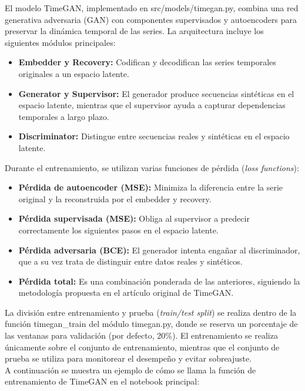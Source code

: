 \documentclass{article}
\renewcommand{\texttt}[1]{{\mononokifont #1}}
\theoremstyle{definition}
\theoremstyle{remark}
\begin{document}
El modelo TimeGAN, implementado en \texttt{src/models/timegan.py}, combina una red generativa adversaria (GAN) con componentes supervisados y autoencoders para preservar la dinámica temporal de las series. La arquitectura incluye los siguientes módulos principales:

\begin{itemize}
    \item \textbf{Embedder y Recovery:} Codifican y decodifican las series temporales originales a un espacio latente.
    \item \textbf{Generator y Supervisor:} El generador produce secuencias sintéticas en el espacio latente, mientras que el supervisor ayuda a capturar dependencias temporales a largo plazo.
    \item \textbf{Discriminator:} Distingue entre secuencias reales y sintéticas en el espacio latente.
\end{itemize}

Durante el entrenamiento, se utilizan varias funciones de pérdida (\textit{loss functions}):

\begin{itemize}
    \item \textbf{Pérdida de autoencoder (MSE):} Minimiza la diferencia entre la serie original y la reconstruida por el embedder y recovery.
    \item \textbf{Pérdida supervisada (MSE):} Obliga al supervisor a predecir correctamente los siguientes pasos en el espacio latente.
    \item \textbf{Pérdida adversaria (BCE):} El generador intenta engañar al discriminador, que a su vez trata de distinguir entre datos reales y sintéticos.
    \item \textbf{Pérdida total:} Es una combinación ponderada de las anteriores, siguiendo la metodología propuesta en el artículo original de TimeGAN.
\end{itemize}

La división entre entrenamiento y prueba (\textit{train/test split}) se realiza dentro de la función \texttt{timegan\_train} del módulo \texttt{timegan.py}, donde se reserva un porcentaje de las ventanas para validación (por defecto, 20\%). El entrenamiento se realiza únicamente sobre el conjunto de entrenamiento, mientras que el conjunto de prueba se utiliza para monitorear el desempeño y evitar sobreajuste.\\

A continuación se muestra un ejemplo de cómo se llama la función de entrenamiento de TimeGAN en el notebook principal:
\end{document}
